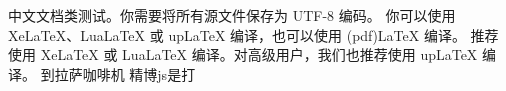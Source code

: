 \documentclass{ctexart}
\begin{document}
中文文档类测试。你需要将所有源文件保存为 UTF-8 编码。
你可以使用 XeLaTeX、LuaLaTeX 或 upLaTeX 编译，也可以使用 (pdf)LaTeX 编译。
推荐使用 XeLaTeX 或 LuaLaTeX 编译。对高级用户，我们也推荐使用 upLaTeX 编译。
 到拉萨咖啡机
精博js{是}{打}
\end{document}
